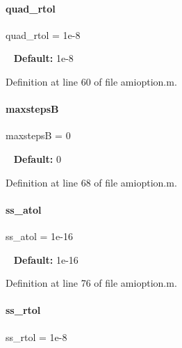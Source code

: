 \mbox{\label{classamioption_ae6739de7f62871e1b32700da8d8d4c2f}} 
\paragraph{\texorpdfstring{quad\_rtol}{quad\_rtol}}
{\footnotesize\ttfamily quad\+\_\+rtol = 1e-\/8}

~\newline
{\bfseries{Default\+:}} 1e-\/8 

Definition at line 60 of file amioption.\+m.

\mbox{\label{classamioption_aca33b56e266b489d1211688e3c223704}} 
\paragraph{\texorpdfstring{maxstepsB}{maxstepsB}}
{\footnotesize\ttfamily maxstepsB = 0}

~\newline
{\bfseries{Default\+:}} 0 

Definition at line 68 of file amioption.\+m.

\mbox{\label{classamioption_a68f52483ecb095cd21d6cab5cd2efff2}} 
\paragraph{\texorpdfstring{ss\_atol}{ss\_atol}}
{\footnotesize\ttfamily ss\+\_\+atol = 1e-\/16}

~\newline
{\bfseries{Default\+:}} 1e-\/16 

Definition at line 76 of file amioption.\+m.

\mbox{\label{classamioption_acc9c287f21293ab04c4303d90e7a6e98}} 
\paragraph{\texorpdfstring{ss\_rtol}{ss\_rtol}}
{\footnotesize\ttfamily ss\+\_\+rtol = 1e-\/8}

